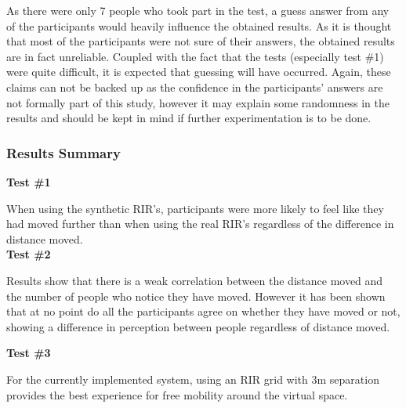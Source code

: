 \documentclass[../../main.tex]{subfiles}
\begin{document}
				As there were only 7 people who took part in the test, a guess answer from any of the participants would heavily influence the obtained results. As it is thought that most of the participants were not sure of their answers, the obtained results are in fact unreliable. Coupled with the fact that the tests (especially test \#1) were quite difficult, it is expected that guessing will have occurred. Again, these claims can not be backed up as the confidence in the participants' answers are not formally part of this study, however it may explain some randomness in the results and should be kept in mind if further experimentation is to be done.



			\subsubsection{Results Summary}


				
				\textbf{Test \#1}

				When using the synthetic \ac{RIR}'s, participants were more likely to feel like they had moved further than when using the real \ac{RIR}'s regardless of the difference in distance moved. \\

				\textbf{Test \#2}

				Results show that there is a weak correlation between the distance moved and the number of people who notice they have moved. However it has been shown that at no point do all the participants agree on whether they have moved or not, showing a difference in perception between people regardless of distance moved.
				
				\textbf{Test \#3}

				For the currently implemented system, using an \ac{RIR} grid with 3m separation provides the best experience for free mobility around the virtual space.
			


			
\end{document}
